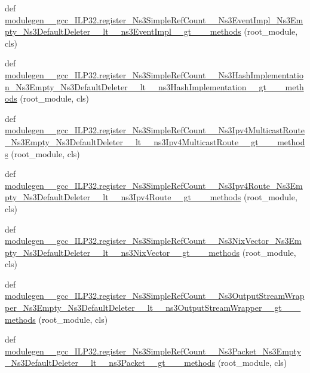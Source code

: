 \begin{DoxyCompactItemize}
\item 
def \hyperlink{namespacemodulegen____gcc__ILP32_a8101c8d46fb3608fb9b8e22e680f1793}{modulegen\+\_\+\+\_\+gcc\+\_\+\+I\+L\+P32.\+register\+\_\+\+Ns3\+Simple\+Ref\+Count\+\_\+\+\_\+\+Ns3\+Event\+Impl\+\_\+\+Ns3\+Empty\+\_\+\+Ns3\+Default\+Deleter\+\_\+\+\_\+lt\+\_\+\+\_\+ns3\+Event\+Impl\+\_\+\+\_\+gt\+\_\+\+\_\+\+\_\+methods} (root\+\_\+module, cls)
\item 
def \hyperlink{namespacemodulegen____gcc__ILP32_a59dad6cf46a3eb90ab74f8388a4708b9}{modulegen\+\_\+\+\_\+gcc\+\_\+\+I\+L\+P32.\+register\+\_\+\+Ns3\+Simple\+Ref\+Count\+\_\+\+\_\+\+Ns3\+Hash\+Implementation\+\_\+\+Ns3\+Empty\+\_\+\+Ns3\+Default\+Deleter\+\_\+\+\_\+lt\+\_\+\+\_\+ns3\+Hash\+Implementation\+\_\+\+\_\+gt\+\_\+\+\_\+\+\_\+methods} (root\+\_\+module, cls)
\item 
def \hyperlink{namespacemodulegen____gcc__ILP32_a46ccc6bf249e8bb1ba19bf6f39180d45}{modulegen\+\_\+\+\_\+gcc\+\_\+\+I\+L\+P32.\+register\+\_\+\+Ns3\+Simple\+Ref\+Count\+\_\+\+\_\+\+Ns3\+Ipv4\+Multicast\+Route\+\_\+\+Ns3\+Empty\+\_\+\+Ns3\+Default\+Deleter\+\_\+\+\_\+lt\+\_\+\+\_\+ns3\+Ipv4\+Multicast\+Route\+\_\+\+\_\+gt\+\_\+\+\_\+\+\_\+methods} (root\+\_\+module, cls)
\item 
def \hyperlink{namespacemodulegen____gcc__ILP32_a4089e3723f80b4237756851c380f9f8a}{modulegen\+\_\+\+\_\+gcc\+\_\+\+I\+L\+P32.\+register\+\_\+\+Ns3\+Simple\+Ref\+Count\+\_\+\+\_\+\+Ns3\+Ipv4\+Route\+\_\+\+Ns3\+Empty\+\_\+\+Ns3\+Default\+Deleter\+\_\+\+\_\+lt\+\_\+\+\_\+ns3\+Ipv4\+Route\+\_\+\+\_\+gt\+\_\+\+\_\+\+\_\+methods} (root\+\_\+module, cls)
\item 
def \hyperlink{namespacemodulegen____gcc__ILP32_acf2fe3353b3614ad36d5edc27d55dc08}{modulegen\+\_\+\+\_\+gcc\+\_\+\+I\+L\+P32.\+register\+\_\+\+Ns3\+Simple\+Ref\+Count\+\_\+\+\_\+\+Ns3\+Nix\+Vector\+\_\+\+Ns3\+Empty\+\_\+\+Ns3\+Default\+Deleter\+\_\+\+\_\+lt\+\_\+\+\_\+ns3\+Nix\+Vector\+\_\+\+\_\+gt\+\_\+\+\_\+\+\_\+methods} (root\+\_\+module, cls)
\item 
def \hyperlink{namespacemodulegen____gcc__ILP32_a4d1d8838713af407eb5e2cdb71da8b0b}{modulegen\+\_\+\+\_\+gcc\+\_\+\+I\+L\+P32.\+register\+\_\+\+Ns3\+Simple\+Ref\+Count\+\_\+\+\_\+\+Ns3\+Output\+Stream\+Wrapper\+\_\+\+Ns3\+Empty\+\_\+\+Ns3\+Default\+Deleter\+\_\+\+\_\+lt\+\_\+\+\_\+ns3\+Output\+Stream\+Wrapper\+\_\+\+\_\+gt\+\_\+\+\_\+\+\_\+methods} (root\+\_\+module, cls)
\item 
def \hyperlink{namespacemodulegen____gcc__ILP32_a0ef742c28dd795a6ce9adfeac1b275b8}{modulegen\+\_\+\+\_\+gcc\+\_\+\+I\+L\+P32.\+register\+\_\+\+Ns3\+Simple\+Ref\+Count\+\_\+\+\_\+\+Ns3\+Packet\+\_\+\+Ns3\+Empty\+\_\+\+Ns3\+Default\+Deleter\+\_\+\+\_\+lt\+\_\+\+\_\+ns3\+Packet\+\_\+\+\_\+gt\+\_\+\+\_\+\+\_\+methods} (root\+\_\+module, cls)

\end{DoxyCompactItemize}

